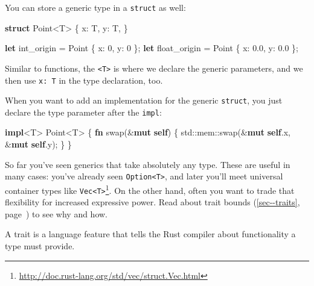 \documentclass[a4paper,]{book}
\renewcommand*{\hyperref}[2][\ar]{%
  \def\ar{#2}%
  #2 (\autoref{#1}, page~\pageref{#1})}
\newenvironment{Shaded}{\begin{snugshade}}{\end{snugshade}}
\newcommand{\KeywordTok}[1]{\textcolor[rgb]{0.13,0.29,0.53}{\textbf{{#1}}}}
\newcommand{\DecValTok}[1]{\textcolor[rgb]{0.00,0.00,0.81}{{#1}}}
\newcommand{\NormalTok}[1]{{#1}}
\renewcommand{\href}[2]{#2\footnote{\url{#1}}}
\begin{document}
You can store a generic type in a \texttt{struct} as well:

\begin{Shaded}
\begin{Highlighting}[]
\KeywordTok{struct} \NormalTok{Point<T> \{}
    \NormalTok{x: T,}
    \NormalTok{y: T,}
\NormalTok{\}}

\KeywordTok{let} \NormalTok{int_origin = Point \{ x: }\DecValTok{0}\NormalTok{, y: }\DecValTok{0} \NormalTok{\};}
\KeywordTok{let} \NormalTok{float_origin = Point \{ x: }\DecValTok{0.0}\NormalTok{, y: }\DecValTok{0.0} \NormalTok{\};}
\end{Highlighting}
\end{Shaded}

Similar to functions, the \texttt{\textless{}T\textgreater{}} is where
we declare the generic parameters, and we then use \texttt{x:\ T} in the
type declaration, too.

When you want to add an implementation for the generic \texttt{struct},
you just declare the type parameter after the \texttt{impl}:

\begin{Shaded}
\begin{Highlighting}[]
\KeywordTok{impl}\NormalTok{<T> Point<T> \{}
    \KeywordTok{fn} \NormalTok{swap(&}\KeywordTok{mut} \KeywordTok{self}\NormalTok{) \{}
        \NormalTok{std::mem::swap(&}\KeywordTok{mut} \KeywordTok{self}\NormalTok{.x, &}\KeywordTok{mut} \KeywordTok{self}\NormalTok{.y);}
    \NormalTok{\}}
\NormalTok{\}}
\end{Highlighting}
\end{Shaded}

So far you've seen generics that take absolutely any type. These are
useful in many cases: you've already seen
\texttt{Option\textless{}T\textgreater{}}, and later you'll meet
universal container types like
\href{http://doc.rust-lang.org/std/vec/struct.Vec.html}{\texttt{Vec\textless{}T\textgreater{}}}.
On the other hand, often you want to trade that flexibility for
increased expressive power. Read about \hyperref[sec--traits]{trait
bounds} to see why and how.


A trait is a language feature that tells the Rust compiler about
functionality a type must provide.
\end{document}
